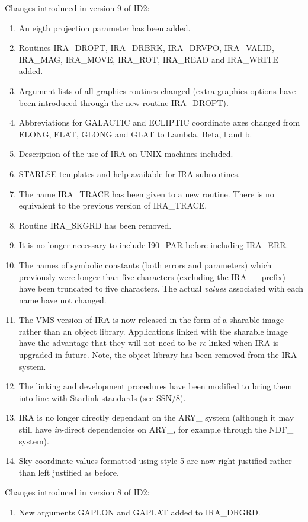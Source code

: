 Changes introduced in version 9 of ID2:
\begin {enumerate}
\item An eigth projection parameter has been added.
\item Routines IRA\_DROPT, IRA\_DRBRK, IRA\_DRVPO, IRA\_VALID, IRA\_MAG,
IRA\_MOVE, IRA\_ROT, IRA\_READ and IRA\_WRITE added.
\item Argument lists of all graphics routines changed (extra graphics options
have been introduced through the new routine IRA\_DROPT).
\item Abbreviations for GALACTIC and ECLIPTIC coordinate axes changed from
ELONG, ELAT, GLONG and GLAT to Lambda, Beta, l and b.
\item Description of the use of IRA on UNIX machines included.
\item STARLSE templates and help available for IRA subroutines.
\item The name IRA\_TRACE has been given to a new routine. There is no
equivalent to the previous version of IRA\_TRACE.
\item Routine IRA\_SKGRD has been removed.
\item It is no longer necessary to include I90\_PAR before including
IRA\_ERR.
\item The names of symbolic constants (both errors and parameters) which previously
were longer than five characters (excluding the IRA\_\_ prefix) have been
truncated to five characters. The actual {\em values} associated with each name
have not changed.
\item The VMS version of IRA is now released in the form of a sharable image
rather than an object library. Applications linked with the sharable image have
the advantage that they will not need to be {\em re}-linked when IRA is upgraded
in future. Note, the object library has been removed from the IRA system.
\item The linking and development procedures have been modified to bring them
into line with Starlink standards (see SSN/8).
\item IRA is no longer directly dependant on the ARY\_ system (although it may
still have {\em in}-direct dependencies on ARY\_, for example through the
NDF\_ system).
\item Sky coordinate values formatted using style 5 are now right justified
rather than left justified as before.

\end {enumerate}

Changes introduced in version 8 of ID2:
\begin {enumerate}
\item New arguments GAPLON and GAPLAT added to IRA\_DRGRD.
\end {enumerate}

